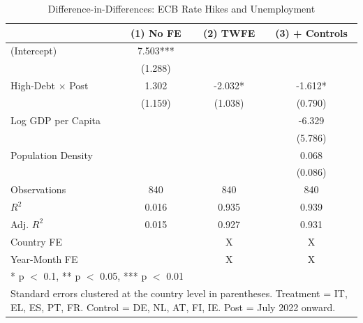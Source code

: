 \begin{table}
\centering
\caption{Difference-in-Differences: ECB Rate Hikes and Unemployment \label{tab:did}}
\centering
\begin{tabular}[t]{lccc}
\toprule
  & (1) No FE & (2) TWFE & (3) + Controls\\
\midrule
(Intercept) & 7.503*** &  & \\
 & (1.288) &  & \\
High-Debt $\times$ Post & 1.302 & -2.032* & -1.612*\\
 & (1.159) & (1.038) & (0.790)\\
Log GDP per Capita &  &  & -6.329\\
 &  &  & (5.786)\\
Population Density &  &  & 0.068\\
 &  &  & (0.086)\\
\midrule
Observations & 840 & 840 & 840\\
$R^2$ & 0.016 & 0.935 & 0.939\\
Adj. $R^2$ & 0.015 & 0.927 & 0.931\\
Country FE &  & X & X\\
Year-Month FE &  & X & X\\
\bottomrule
\multicolumn{4}{l}{\rule{0pt}{1em}* p $<$ 0.1, ** p $<$ 0.05, *** p $<$ 0.01}\\
\multicolumn{4}{l}{\rule{0pt}{1em}Standard errors clustered at the country level in parentheses. Treatment = IT, EL, ES, PT, FR. Control = DE, NL, AT, FI, IE. Post = July 2022 onward.}\\
\end{tabular}
\end{table}
